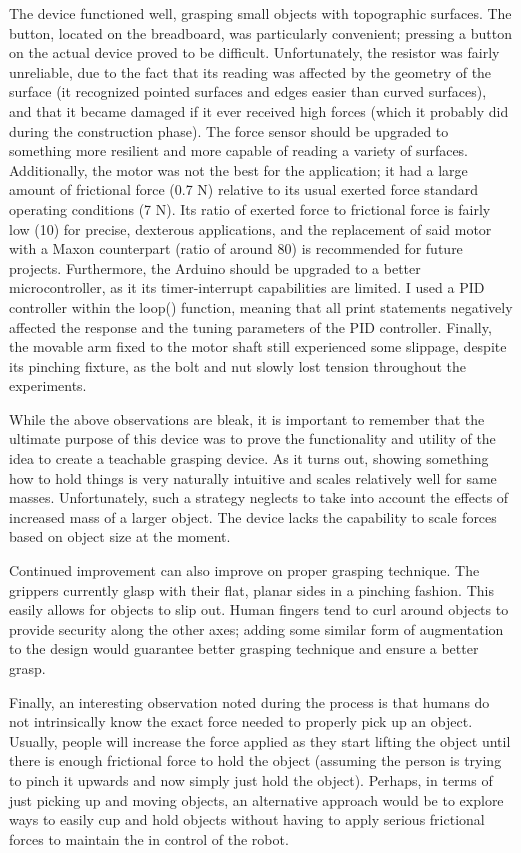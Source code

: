 \documentclass[letterpaper, 10 pt, conference]{ieeeconf}  %
\begin{document}
The device functioned well, grasping small objects with topographic surfaces. The button, located on the breadboard, was particularly convenient; pressing a button on the actual device proved to be difficult. Unfortunately, the resistor was fairly unreliable, due to the fact that its reading was affected by the geometry of the surface (it recognized pointed surfaces and edges easier than curved surfaces), and that it became damaged if it ever received high forces (which it probably did during the construction phase). The force sensor should be upgraded to something more resilient and more capable of reading a variety of surfaces. Additionally, the motor was not the best for the application; it had a large amount of frictional force (0.7 N) relative to its usual exerted force standard operating conditions (7  N). Its ratio of exerted force to frictional force is fairly low (10) for precise, dexterous applications, and the replacement of said motor with a Maxon counterpart (ratio of around 80) is recommended for future projects. Furthermore, the Arduino should be upgraded to a better microcontroller, as it its timer-interrupt capabilities are limited. I used a PID controller within the loop() function, meaning that all print statements negatively affected the response and the tuning parameters of the PID controller. Finally, the movable arm fixed to the motor shaft still experienced some slippage, despite its pinching fixture, as the bolt and nut slowly lost tension throughout the experiments.

While the above observations are bleak, it is important to remember that the ultimate purpose of this device was to prove the functionality and utility of the idea to create a teachable grasping device. As it turns out, showing something how to hold things is very naturally intuitive and scales relatively well for same masses. Unfortunately, such a strategy neglects to take into account the effects of increased mass of a larger object. The device lacks the capability to scale forces based on object size at the moment.

Continued improvement can also improve on proper grasping technique. The grippers currently glasp with their flat, planar sides in a pinching fashion. This easily allows for objects to slip out. Human fingers tend to curl around objects to provide security along the other axes; adding some similar form of augmentation to the design would guarantee better grasping technique and ensure a better grasp.

Finally, an interesting observation noted during the process is that humans do not intrinsically know the exact force needed to properly pick up an object. Usually, people will increase the force applied as they start lifting the object until there is enough frictional force to hold the object (assuming the person is trying to pinch it upwards and now simply just hold the object). Perhaps, in terms of just picking up and moving objects, an alternative approach would be to explore ways to easily cup and hold objects without having to apply serious frictional forces to maintain the in control of the robot.
\end{document}
